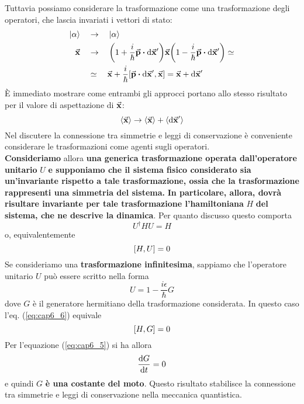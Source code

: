 \documentclass[a4paper,12pt,oneside]{book}
\begin{document}
Tuttavia possiamo considerare la trasformazione come una trasformazione degli operatori, che lascia invariati i vettori di stato:
\begin{align}
  \ket{\alpha} \quad&\to\quad \ket{\alpha}\nonumber\\
  \va{x} \quad&\to\quad \qty(1+\frac{i}{\hbar}\va{p}\vdot\dd\va{x}')\va{x}\qty(1-\frac{i}{\hbar}\va{p}\vdot\dd\va{x}') \simeq \nonumber\\
  &\simeq\quad \va{x} + \frac{i}{\hbar}\comm{\va{p}\vdot\dd\va{x}'}{\va{x}} = \va{x}+ \dd\va{x}'
\end{align}
È immediato mostrare come entrambi gli approcci portano allo stesso risultato per il valore di aspettazione di $\va{x}$:
\begin{equation}
  \ev{\va{x}} \to \ev{\va{x}} + \ev{\dd\va{x}'}
\end{equation}
Nel discutere la connessione tra simmetrie e leggi di conservazione è conveniente considerare le trasformazioni come agenti sugli operatori.\\
\textbf{Consideriamo} allora \textbf{una generica trasformazione operata dall'operatore unitario} $U$ \textbf{e supponiamo che il sistema fisico considerato sia un'invariante rispetto a tale trasformazione, ossia che la trasformazione rappresenti una simmetria del sistema.} \textbf{In particolare, allora, dovrà risultare invariante per tale trasformazione l'hamiltoniana} $H$ \textbf{del sistema, che ne descrive la dinamica}. Per quanto discusso questo comporta
\begin{equation}
  U^{\dag}HU = H
\end{equation}
o, equivalentemente
\begin{equation}
  \label{eq:cap6_6}
  \comm{H}{U}= 0
\end{equation}
Se consideriamo una \textbf{trasformazione infinitesima}, sappiamo che l'operatore unitario $U$ può essere scritto nella forma
\begin{equation}
  U= 1- \frac{i\epsilon}{\hbar}G
\end{equation}
dove $G$ è il generatore hermitiano della trasformazione considerata. In questo caso l'eq. (\ref{eq:cap6_6}) equivale
\begin{equation}
  \comm{H}{G}= 0
\end{equation}
Per l'equazione (\ref{eq:cap6_5}) si ha allora
\begin{equation}
  \dv{G}{t} = 0
\end{equation}
e quindi $G$ \textbf{è una costante del moto}. Questo risultato stabilisce la connessione tra simmetrie e leggi di conservazione nella meccanica quantistica.\\
\end{document}
